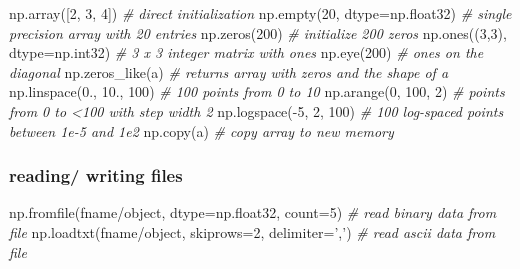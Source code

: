 \documentclass[10pt,a4paperpaper,twocolumn]{article}
\newenvironment{Shaded}{}{}
\newcommand{\DecValTok}[1]{\textcolor[rgb]{0.25,0.63,0.44}{{#1}}}
\newcommand{\StringTok}[1]{\textcolor[rgb]{0.25,0.44,0.63}{{#1}}}
\newcommand{\CommentTok}[1]{\textcolor[rgb]{0.38,0.63,0.69}{\textit{{#1}}}}
\newcommand{\OperatorTok}[1]{\textcolor[rgb]{0.40,0.40,0.40}{{#1}}}
\newcommand{\BuiltInTok}[1]{{#1}}
\newcommand{\NormalTok}[1]{{#1}}
\begin{document}
\begin{Shaded}
\begin{Highlighting}[]
\NormalTok{np.array([}\DecValTok{2}\NormalTok{, }\DecValTok{3}\NormalTok{, }\DecValTok{4}\NormalTok{])             }\CommentTok{# direct initialization}
\NormalTok{np.empty(}\DecValTok{20}\NormalTok{, dtype}\OperatorTok{=}\NormalTok{np.float32)  }\CommentTok{# single precision array with 20 entries}
\NormalTok{np.zeros(}\DecValTok{200}\NormalTok{)                   }\CommentTok{# initialize 200 zeros}
\NormalTok{np.ones((}\DecValTok{3}\NormalTok{,}\DecValTok{3}\NormalTok{), dtype}\OperatorTok{=}\NormalTok{np.int32)  }\CommentTok{# 3 x 3 integer matrix with ones}
\NormalTok{np.eye(}\DecValTok{200}\NormalTok{)                     }\CommentTok{# ones on the diagonal}
\NormalTok{np.zeros_like(a)                }\CommentTok{# returns array with zeros and the shape of a}
\NormalTok{np.linspace(}\DecValTok{0}\NormalTok{., }\DecValTok{10}\NormalTok{., }\DecValTok{100}\NormalTok{)       }\CommentTok{# 100 points from 0 to 10}
\NormalTok{np.arange(}\DecValTok{0}\NormalTok{, }\DecValTok{100}\NormalTok{, }\DecValTok{2}\NormalTok{)            }\CommentTok{# points from 0 to <100 with step width 2}
\NormalTok{np.logspace(}\OperatorTok{-}\DecValTok{5}\NormalTok{, }\DecValTok{2}\NormalTok{, }\DecValTok{100}\NormalTok{)         }\CommentTok{# 100 log-spaced points between 1e-5 and 1e2}
\NormalTok{np.copy(a)                      }\CommentTok{# copy array to new memory}
\end{Highlighting}
\end{Shaded}

\hypertarget{reading-writing-files}{\subsubsection{reading/ writing
files}\label{reading-writing-files}}

\begin{Shaded}
\begin{Highlighting}[]
\NormalTok{np.fromfile(fname}\OperatorTok{/}\BuiltInTok{object}\NormalTok{, dtype}\OperatorTok{=}\NormalTok{np.float32, count}\OperatorTok{=}\DecValTok{5}\NormalTok{)  }\CommentTok{# read binary data from file}
\NormalTok{np.loadtxt(fname}\OperatorTok{/}\BuiltInTok{object}\NormalTok{, skiprows}\OperatorTok{=}\DecValTok{2}\NormalTok{, delimiter}\OperatorTok{=}\StringTok{','}\NormalTok{)   }\CommentTok{# read ascii data from file}
\end{Highlighting}
\end{Shaded}
\end{document}

